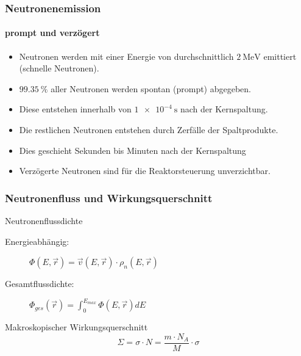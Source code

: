 \documentclass{beamer}[9pt]
\begin{document}
\begin{frame}
\frametitle{Neutronenemission}
\framesubtitle{prompt und verzögert}
\begin{itemize}
\item Neutronen werden mit einer Energie von durchschnittlich $\SI{2}{\MeV}$ emittiert (schnelle Neutronen).
\item $\SI{99.35}{\percent}$ aller Neutronen werden spontan (prompt) abgegeben.
\item Diese entstehen innerhalb von $\SI{1e-4}{\second}$   nach der Kernspaltung.
\item Die restlichen Neutronen entstehen durch Zerfälle der Spaltprodukte.
\item Dies geschieht Sekunden bis Minuten nach der Kernspaltung
\item Verzögerte Neutronen sind für die Reaktorsteuerung unverzichtbar.
\end{itemize}
\end{frame}




\begin{frame}
\frametitle{Neutronenfluss und Wirkungsquerschnitt}
\begin{block}{Neutronenflussdichte}
\begin{description}
\item[Energieabhängig:]$\Phi(E,\vec r) = \vec v(E,\vec r)\cdot \rho_n(E,\vec r)$
\item[Gesamtflussdichte:] $\Phi_{ges}(\vec r)= \int_0^{E_{max}}\Phi(E, \vec r) dE$
\end{description}

\end{block}

\begin{block}{Makroskopischer Wirkungsquerschnitt}
\[
\Sigma = \sigma \cdot N = \frac{m\cdot N_A}{M}\cdot \sigma
\]
\end{block}
\end{frame}
\end{document}
